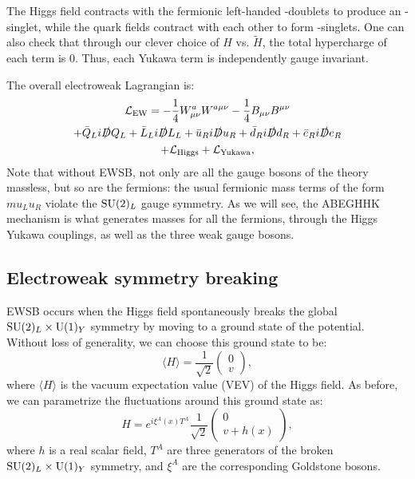 The Higgs field contracts with the fermionic left-handed \SU[2]-doublets to produce an \SU[2]-singlet, while the quark fields contract with each other to form \SU[3]-singlets.
One can also check that through our clever choice of $H$ vs. $\tilde H$, the total hypercharge of each term is $0$.
Thus, each Yukawa term is independently gauge invariant.

The overall electroweak Lagrangian is:
\begin{multline}
	\label{eq:01_sm_ew_lagrangian}
	\mathcal{L}_{\mathrm{EW}} = -\frac{1}{4} W^a_{\mu\nu} W^{a\mu\nu} - \frac{1}{4} B_{\mu\nu} B^{\mu\nu} \\ 
	+ \bar{Q}_L i \cslashed{D} Q_L + \bar{L}_L i \cslashed{D} L_L + \bar{u}_R i \cslashed{D} u_R + \bar{d}_R i \cslashed{D} d_R + \bar{e}_R i \cslashed{D} e_R \\
	+ \mathcal{L}_{\mathrm{Higgs}} + \mathcal{L}_{\mathrm{Yukawa}},
\end{multline}
Note that without EWSB, not only are all the gauge bosons of the theory massless, but so are the fermions:
the usual fermionic mass terms of the form $m u_L u_R$ violate the $\SU[2]_L$ gauge symmetry.
As we will see, the ABEGHHK mechanism is what generates masses for all the fermions, through the Higgs Yukawa couplings, as well as the three weak gauge bosons.

\subsection{Electroweak symmetry breaking}
\label{sec:01_sm_ew_ewsb}

EWSB occurs when the Higgs field spontaneously breaks the global $\SU[2]_L \times \UU[1]_Y$ symmetry by moving to a ground state of the potential.
Without loss of generality, we can choose this ground state to be:
\begin{equation}
	\label{eq:01_sm_ew_higgs_vev}
	\langle H \rangle = \frac{1}{\sqrt{2}} \begin{pmatrix} 0 \\ v \end{pmatrix},
\end{equation}
where $\langle H \rangle$ is the vacuum expectation value (VEV) of the Higgs field.
As before, we can parametrize the fluctuations around this ground state as:
\begin{equation}
	\label{eq:01_sm_ew_higgs_fluctuations}
	H = e^{i \xi^A(x)T^A}
	\frac{1}{\sqrt{2}} \begin{pmatrix} 0 \\ v + h(x) \end{pmatrix},
\end{equation}
where $h$ is a real scalar field, $T^A$ are three generators of the broken $\SU[2]_L \times \UU[1]_Y$ symmetry, and $\xi^A$ are the corresponding Goldstone bosons.


